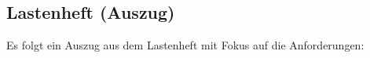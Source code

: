\subsection{Lastenheft (Auszug)}
\label{app:Lastenheft}
Es folgt ein Auszug aus dem Lastenheft mit Fokus auf die Anforderungen:

